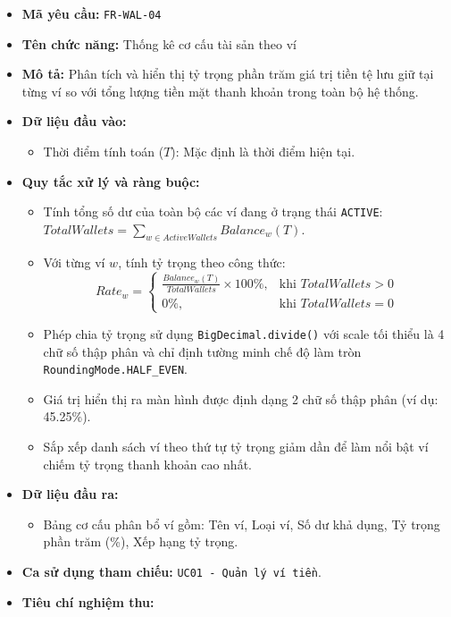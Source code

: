 \documentclass[11pt,a4paper]{article}
\providecommand{\tightlist}{
  \setlength{\itemsep}{0pt}\setlength{\parskip}{0pt}}
\begin{document}
\begin{itemize}
\tightlist
\item
  \textbf{Mã yêu cầu:} \texttt{FR-WAL-04}
\item
  \textbf{Tên chức năng:} Thống kê cơ cấu tài sản theo ví
\item
  \textbf{Mô tả:} Phân tích và hiển thị tỷ trọng phần trăm giá trị tiền
  tệ lưu giữ tại từng ví so với tổng lượng tiền mặt thanh khoản trong
  toàn bộ hệ thống.
\item
  \textbf{Dữ liệu đầu vào:}

  \begin{itemize}
  \tightlist
  \item
    Thời điểm tính toán (\(T\)): Mặc định là thời điểm hiện tại.
  \end{itemize}
\item
  \textbf{Quy tắc xử lý và ràng buộc:}

  \begin{itemize}
  \tightlist
  \item
    Tính tổng số dư của toàn bộ các ví đang ở trạng thái
    \texttt{ACTIVE}:
    \(TotalWallets = \sum_{w \in ActiveWallets} Balance_w(T)\).
  \item
    Với từng ví \(w\), tính tỷ trọng theo công thức:
    \[Rate_w = \begin{cases} \frac{Balance_w(T)}{TotalWallets} \times 100\%, & \text{khi } TotalWallets > 0 \\ 0\%, & \text{khi } TotalWallets = 0 \end{cases}\]
  \item
    Phép chia tỷ trọng sử dụng \texttt{BigDecimal.divide()} với scale
    tối thiểu là 4 chữ số thập phân và chỉ định tường minh chế độ làm
    tròn \texttt{RoundingMode.HALF\_EVEN}.
  \item
    Giá trị hiển thị ra màn hình được định dạng 2 chữ số thập phân (ví
    dụ: 45.25\%).
  \item
    Sắp xếp danh sách ví theo thứ tự tỷ trọng giảm dần để làm nổi bật ví
    chiếm tỷ trọng thanh khoản cao nhất.
  \end{itemize}
\item
  \textbf{Dữ liệu đầu ra:}

  \begin{itemize}
  \tightlist
  \item
    Bảng cơ cấu phân bổ ví gồm: Tên ví, Loại ví, Số dư khả dụng, Tỷ
    trọng phần trăm (\%), Xếp hạng tỷ trọng.
  \end{itemize}
\item
  \textbf{Ca sử dụng tham chiếu:} \texttt{UC01\ -\ Quản\ lý\ ví\ tiền}.
\item
  \textbf{Tiêu chí nghiệm thu:}


\end{itemize}
\end{document}
